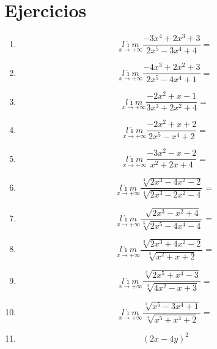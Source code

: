 \documentclass[oneside,spanish,letter]{article}
\begin{document}
\section{Ejercicios}
\begin{enumerate}
 \item $$\underset{x\rightarrow +\infty}{l\acute{\imath}m} \frac{-3x^4+2x^3+3}{2x^5-3x^4+4}=$$
 \item $$\underset{x\rightarrow +\infty}{l\acute{\imath}m} \frac{-4x^3+2x^2+3}{2x^5-4x^4+1}=$$
 \item $$\underset{x\rightarrow +\infty}{l\acute{\imath}m} \frac{-2x^2+x-1}{3x^3+2x^2+4}=$$
 \item $$\underset{x\rightarrow +\infty}{l\acute{\imath}m} \frac{-2x^2+x+2}{2x^5-x^4+2}=$$
 \item $$\underset{x\rightarrow +\infty}{l\acute{\imath}m} \frac{-3x^2-x-2}{x^2+2x+4}=$$
 \item $$\underset{x\rightarrow +\infty}{l\acute{\imath}m} \frac{\sqrt[4]{2x^3-4x^2-2}}{\sqrt[4]{2x^3-2x^2-4}}=$$
 \item $$\underset{x\rightarrow +\infty}{l\acute{\imath}m} \frac{\sqrt[]{2x^3-x^2+4}}{\sqrt[5]{2x^5-4x^4-4}}=$$
 \item $$\underset{x\rightarrow +\infty}{l\acute{\imath}m} \frac{\sqrt[3]{2x^3+4x^2-2}}{\sqrt[5]{x^2+x+2}}=$$
 \item $$\underset{x\rightarrow +\infty}{l\acute{\imath}m} \frac{\sqrt[3]{2x^5+x^4-3}}{\sqrt[3]{4x^2-x+3}}=$$
 \item $$\underset{x\rightarrow +\infty}{l\acute{\imath}m} \frac{\sqrt[5]{x^5-3x^4+1}}{\sqrt[4]{x^5+x^4+2}}=$$
\item $$(2x-4y)^2$$
 \end{enumerate}
  \newpage
\end{document}
